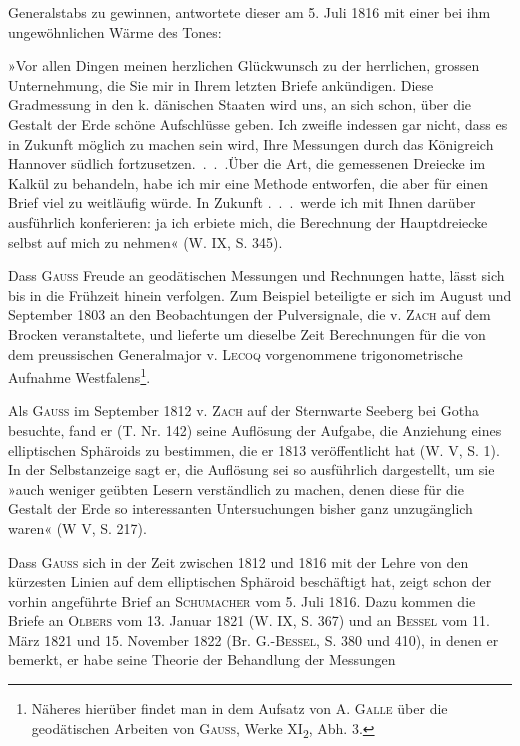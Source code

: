 \noindent Generalstabs zu gewinnen, antwortete dieser am 5. Juli 1816 mit einer bei ihm ungewöhnlichen
Wärme des Tones:
\par
»Vor allen Dingen meinen herzlichen Glückwunsch zu der herrlichen,
grossen Unternehmung, die Sie mir in Ihrem letzten Briefe ankündigen.
Diese Gradmessung in den k. dänischen Staaten wird uns, an sich schon,
über die Gestalt der Erde schöne Aufschlüsse geben. Ich zweifle indessen
gar nicht, dass es in Zukunft möglich zu machen sein wird, Ihre Messungen
durch das Königreich Hannover südlich fortzusetzen.\ .\ .\ .\quad Über die Art, die
gemessenen Dreiecke im Kalkül zu behandeln, habe ich mir eine Methode
entworfen, die aber für einen Brief viel zu weitläufig würde. In Zukunft
.\ .\ .\ werde ich mit Ihnen darüber ausführlich konferieren: ja ich erbiete
mich, die Berechnung der Hauptdreiecke selbst auf mich zu nehmen« (W. IX,
S. 345).
\par
Dass \textsc{Gauss} Freude an geodätischen Messungen und Rechnungen hatte,
lässt sich bis in die Frühzeit hinein verfolgen. Zum Beispiel beteiligte er
sich im August und September 1803 an den Beobachtungen der Pulversignale,
die v. \textsc{Zach} auf dem Brocken veranstaltete, und lieferte um dieselbe Zeit
Berechnungen für die von dem preussischen Generalmajor v. \textsc{Lecoq} vorgenommene
trigonometrische Aufnahme Westfalens\footnote{Näheres hierüber findet man in dem Aufsatz von A. \textsc{Galle} über die geodätischen Arbeiten von \textsc{Gauss}, Werke XI\textsubscript{2}, Abh. 3.}.
\par
Als \textsc{Gauss} im September 1812 v. \textsc{Zach} auf der Sternwarte Seeberg bei
Gotha besuchte, fand er (T. Nr. 142) seine Auflösung der Aufgabe, die Anziehung
eines elliptischen Sphäroids zu bestimmen, die er 1813 veröffentlicht
hat (W. V, S. 1). In der Selbstanzeige sagt er, die Auflösung sei so ausführlich
dargestellt, um sie »auch weniger geübten Lesern verständlich zu
machen, denen diese für die Gestalt der Erde so interessanten Untersuchungen
bisher ganz unzugänglich waren« (W V, S. 217).
\par
Dass \textsc{Gauss} sich in der Zeit zwischen 1812 und 1816 mit der Lehre von
den kürzesten Linien auf dem elliptischen Sphäroid beschäftigt hat, zeigt schon
der vorhin angeführte Brief an \textsc{Schumacher} vom 5. Juli 1816. Dazu kommen
die Briefe an \textsc{Olbers} vom 13. Januar 1821 (W. IX, S. 367) und an \textsc{Bessel}
vom 11. März 1821 und 15. November 1822 (Br. G.-\textsc{Bessel}, S. 380 und 410),
in denen er bemerkt, er habe seine Theorie der Behandlung der Messungen
